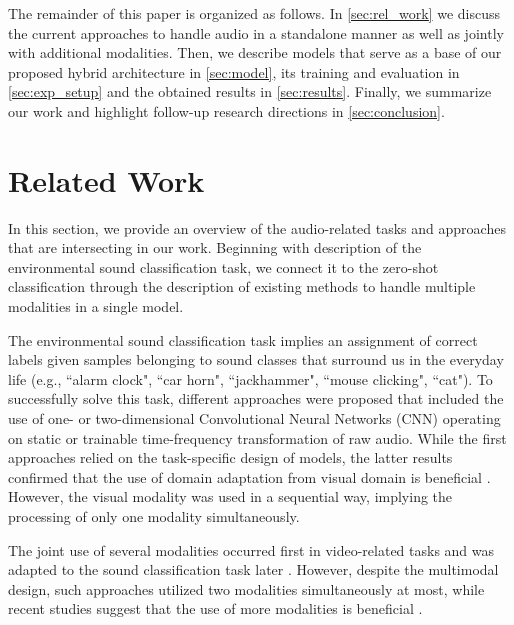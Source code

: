 \documentclass[runningheads]{llncs}
\begin{document}
The remainder of this paper is organized as follows.
In \autoref{sec:rel_work} we discuss the current approaches to handle audio in a standalone manner as well as jointly with additional modalities.
Then, we describe models that serve as a base of our proposed hybrid architecture in \autoref{sec:model}, its training and evaluation in \autoref{sec:exp_setup} and the obtained results in \autoref{sec:results}.
Finally, we summarize our work and highlight follow-up research directions in \autoref{sec:conclusion}.

\section{Related Work} \label{sec:rel_work}
In this section, we provide an overview of the audio-related tasks and approaches that are intersecting in our work.
Beginning with description of the environmental sound classification task, we connect it to the zero-shot classification through the description of existing methods to handle multiple modalities in a single model.

The environmental sound classification task implies an assignment of correct labels given samples belonging to sound classes that surround us in the everyday life (e.g., ``alarm clock", ``car horn", ``jackhammer", ``mouse clicking", ``cat").
To successfully solve this task, different approaches were proposed that included the use of one- \cite{tokozume2017envnet,tokozume2017envnetv2} or two-dimensional Convolutional Neural Networks (CNN) operating on static \cite{piczak2015cnn,salamon2017cnn,xie2019zero,guzhov2020esrn,kumar2020weanet,palanisamy2020densenet,xie2021zero,gong2021ast,verbitskiy2021erann} or trainable \cite{sailor2017convrbm,guzhov2021esrnx} time-frequency transformation of raw audio.
While the first approaches relied on the task-specific design of models, the latter results confirmed that the use of domain adaptation from visual domain is beneficial \cite{guzhov2020esrn,palanisamy2020densenet,guzhov2021esrnx}.
However, the visual modality was used in a sequential way, implying the processing of only one modality simultaneously.

The joint use of several modalities occurred first in video-related \cite{kim2019audiocaps,zhang2021sscl,dzabraev2021mdmmt} tasks and was adapted to the sound classification task later \cite{islam2019soundsemantics,wang2021multimodal}.
However, despite the multimodal design, such approaches utilized two modalities simultaneously at most, while recent studies suggest that the use of more modalities is beneficial \cite{alayrac2020versatile,akbari2021vatt}.
\end{document}
